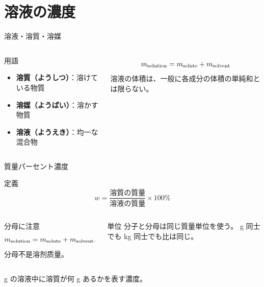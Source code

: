 \documentclass[notheorems,aspectratio=169]{beamer}
\newcommand{\jp}[1]{\textbf{\color{JapanBlue}#1}}
\begin{document}
\section{溶液の濃度}

\begin{frame}{溶液・溶質・溶媒}
  \begin{columns}[c,onlytextwidth]
    \centering
    \begin{block}{用語}
      \begin{itemize}
        \item \jp{溶質（ようしつ）}：溶けている物質
        \item \jp{溶媒（ようばい）}：溶かす物質
        \item \jp{溶液（ようえき）}：均一な混合物
      \end{itemize}
    \end{block}
    \[
      m_{\rm solution}
      =m_{\rm solute}+m_{\rm solvent}
    \]
    溶液の体積は、一般に各成分の体積の単純和とは限らない。
  \end{columns}
\end{frame}

\begin{frame}{質量パーセント濃度}
  \begin{block}{定義}
    \[
      \boxed{
        w
        =
        \frac{\text{溶質の質量}}
             {\text{溶液の質量}}
        \times100\%
      }
    \]
  \end{block}

  \begin{columns}[T,onlytextwidth]
    \begin{exampleblock}{分母に注意}
      \[
        m_{\rm solution}
        =m_{\rm solute}+m_{\rm solvent}.
      \]
      分母不是溶剂质量。
    \end{exampleblock}
    \begin{alertblock}{単位}
      分子と分母は同じ質量単位を使う。
      g 同士でも kg 同士でも比は同じ。
    \end{alertblock}
  \end{columns}

   g の溶液中に溶質が何 g あるかを表す濃度。
\end{frame}
\end{document}
